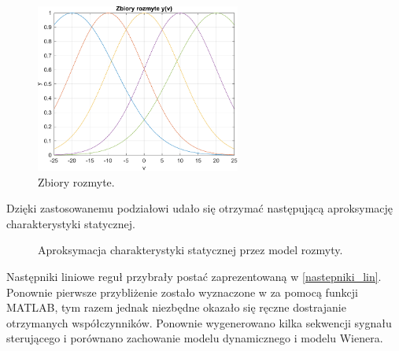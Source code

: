 \documentclass[a4paper,titlepage,11pt,floatssmall]{mwrep}
\begin{document}
\begin{figure}[h!]
\centering
\includegraphics[width=0.6\textwidth]{pictures/fuzzy_set_wien}
\caption{Zbiory rozmyte.}
\end{figure}

\newpage

\noindent Dzięki zastosowanemu podziałowi udało się otrzymać następującą aproksymację charakterystyki statycznej.

\begin{figure}[h!]
\centering
{}
\hfill
{}
\caption{Aproksymacja charakterystyki statycznej przez model rozmyty.}
\end{figure}

Następniki liniowe reguł przybrały postać zaprezentowaną w \ref{nastepniki_lin}. Ponownie pierwsze przybliżenie zostało wyznaczone w za pomocą funkcji MATLAB, tym razem jednak niezbędne okazało się ręczne dostrajanie otrzymanych współczynników. Ponownie wygenerowano kilka sekwencji sygnału sterującego i porównano zachowanie modelu dynamicznego i modelu Wienera.
\end{document}
